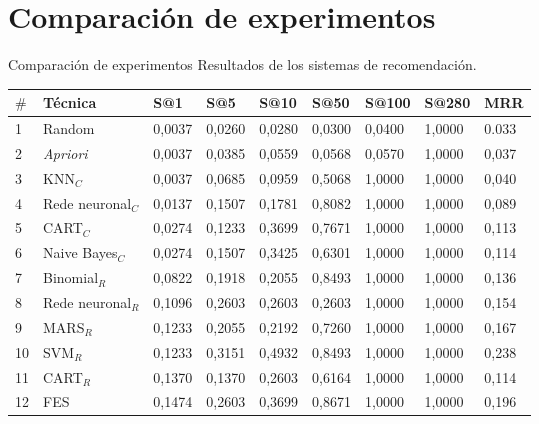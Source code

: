 \section{Comparación de experimentos}

\begin{frame}		
	\begin{block}{Comparación de experimentos}
		Resultados de los sistemas de recomendación.
		\bgroup
		\begin{table}[!htp]
			\centering
			\tiny
			\begin{tabular}{|l|l|l|l|l|l|l|l|l|} \hline
				\textbf{\(\mathbf{\#}\)} & \textbf{Técnica}&\textbf{S@1}&\textbf{S@5} & \textbf{S@10} & \textbf{S@50} & \textbf{S@100} & \textbf{S@280} & \textbf{MRR} \\ \hline
				
\rowcolor{roxo}		1  & Random				& 0,0037 & 0,0260 & 0,0280 & 0,0300 & 0,0400 & 1,0000 & 0.033 \\ \hline
\rowcolor{roxo}		2  & \emph{Apriori}			& 0,0037 & 0,0385 & 0,0559 & 0,0568 & 0,0570 & 1,0000 & 0,037 \\ \hline
\rowcolor{amarelo}	3  & KNN\(_C\)				& 0,0037 & 0,0685 & 0,0959 & 0,5068 & 1,0000 & 1,0000 & 0,040 \\ \hline
\rowcolor{amarelo}	4  & Rede neuronal\(_C\)		& 0,0137 & 0,1507 & 0,1781 & 0,8082 & 1,0000 & 1,0000 & 0,089 \\ \hline
\rowcolor{amarelo}	5  & CART\(_C\)				& 0,0274 & 0,1233 & 0,3699 & 0,7671 & 1,0000 & 1,0000 & 0,113 \\ \hline
\rowcolor{amarelo}	6  & Naive Bayes\(_C\)     	& 0,0274 & 0,1507 & 0,3425 & 0,6301 & 1,0000 & 1,0000 & 0,114 \\ \hline
\rowcolor{verde}	7  & Binomial\(_R\) 		& 0,0822 & 0,1918 & 0,2055 & 0,8493 & 1,0000 & 1,0000 & 0,136 \\ \hline
\rowcolor{verde}	8  & Rede neuronal\(_R\)     	& 0,1096 & 0,2603 & 0,2603 & 0,2603 & 1,0000 & 1,0000 & 0,154 \\ \hline
\rowcolor{verde}	9  & MARS\(_R\)     		& 0,1233 & 0,2055 & 0,2192 & 0,7260 & 1,0000 & 1,0000 & 0,167 \\ \hline
\rowcolor{verde}	10 & SVM\(_R\)     			& 0,1233 & 0,3151 & 0,4932 & 0,8493 & 1,0000 & 1,0000 & 0,238 \\ \hline
\rowcolor{verde}	11 & CART\(_R\)    			& 0,1370 & 0,1370 & 0,2603 & 0,6164 & 1,0000 & 1,0000 & 0,114 \\ \hline
\rowcolor{roxo}		12 & FES           			& 0,1474 & 0,2603 & 0,3699 & 0,8671 & 1,0000 & 1,0000 & 0,196 \\ \hline

\end{tabular}
\end{table}
\end{block}
\end{frame}
